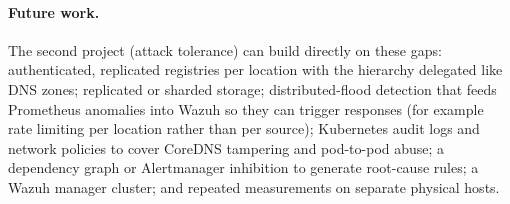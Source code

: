 \paragraph{Future work.}
The second project (attack tolerance) can build directly on these gaps: authenticated, replicated
registries per location with the hierarchy delegated like DNS zones; replicated or sharded
storage; distributed-flood detection that feeds Prometheus anomalies into Wazuh so they can trigger
responses (for example rate limiting per location rather than per source); Kubernetes audit logs
and network policies to cover CoreDNS tampering and pod-to-pod abuse; a dependency graph or
Alertmanager inhibition to generate root-cause rules; a Wazuh manager cluster; and repeated
measurements on separate physical hosts.
